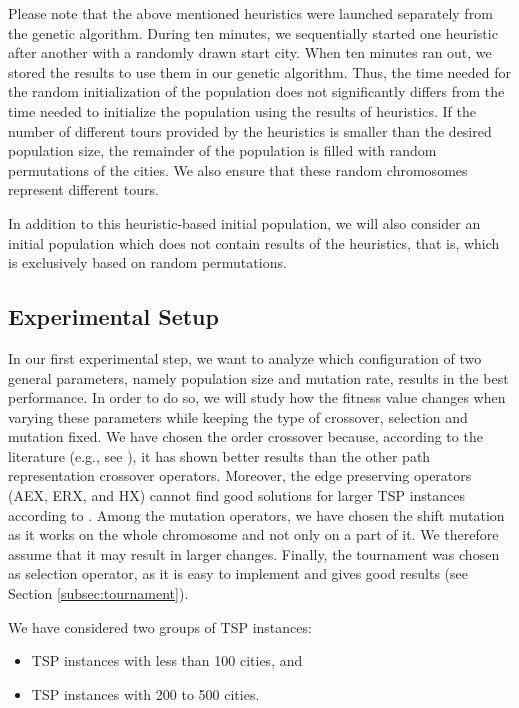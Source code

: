 Please note that the above mentioned heuristics were launched separately from the genetic algorithm. During ten minutes, we sequentially started one heuristic after another with a randomly drawn start city. When ten minutes ran out, we stored the results to use them in our genetic algorithm. Thus, the time needed for the random initialization of the population does not significantly differs from the time needed to initialize the population using the results of heuristics. If the number of different tours provided by the heuristics is smaller than the desired population size, the remainder of the population is filled with random permutations of the cities. We also ensure that these random chromosomes represent different tours.\par 

In addition to this heuristic-based initial population, we will also consider an initial population which does not contain results of the heuristics, that is, which is exclusively based on random permutations.

\subsection{Experimental Setup}


In our first experimental step, we want to analyze which configuration of two general parameters, namely population size and mutation rate, results in the best performance.  In order to do so, we will study how the fitness value changes when varying these parameters while keeping the type of crossover, selection and mutation fixed. We have chosen the order crossover because, according to the literature (e.g., see \cite{starkweather1991comparison}), it has shown better results than the other path representation crossover operators. Moreover, the edge preserving operators (AEX, ERX, and HX) cannot find good solutions for larger TSP instances according to \citeauthor{potvin1996genetic} \cite{potvin1996genetic}. Among the mutation operators, we have chosen the shift mutation as it works on the whole chromosome and not only on a part of it. We therefore assume that it may result in larger changes. Finally, the tournament was chosen as selection operator, as it is easy to implement and gives good results (see Section \ref{subsec:tournament}). \par 

We have considered two groups of TSP instances:

\begin{itemize}
	\item TSP instances with less than 100 cities, and
	\item TSP instances with 200 to 500 cities.
\end{itemize}	

